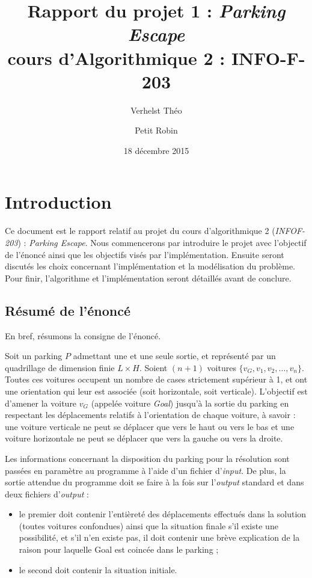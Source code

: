 \documentclass{article}
\title{Rapport du projet 1 : \textit{Parking Escape}\\cours d'Algorithmique 2 : INFO-F-203}
\author{Verhelst Théo \and Petit Robin}
\date{18 décembre 2015}
\begin{document}
\maketitle
\tableofcontents
\newpage
{}

\section{Introduction}
	Ce document est le rapport relatif au projet du cours d'algorithmique 2 (\textit{INFOF-203}) : \textit{Parking Escape}. Nous commencerons par
	introduire le projet avec l'objectif de l'énoncé ainsi que les objectifs visés par l'implémentation. Ensuite seront discutés les choix concernant
	l'implémentation et la modélisation du problème. Pour finir, l'algorithme et l'implémentation seront détaillés avant de conclure.

	\subsection{Résumé de l'énoncé}
		En bref, résumons la consigne de l'énoncé.

		Soit un parking $P$ admettant une et une seule sortie, et représenté par un quadrillage de dimension finie $L\times H$. Soient $(n+1)$ voitures
		$\{v_G, v_1, v_2, \ldots, v_n\}$. Toutes ces voitures occupent un nombre de cases strictement supérieur à 1, et ont une
		orientation qui leur est associée (soit horizontale, soit verticale). L'objectif est d'amener la voiture $v_G$ (appelée voiture \textit{Goal})
		jusqu'à la sortie du parking en respectant les déplacements relatifs à l'orientation de chaque voiture, à savoir : une voiture verticale ne peut
		se déplacer que vers le haut ou vers le bas et une voiture horizontale ne peut se déplacer que vers la gauche ou vers la droite.

		Les informations concernant la disposition du parking pour la résolution sont passées en paramètre au programme à l'aide d'un fichier d'\textit{input}.
		De plus, la sortie attendue du programme doit se faire à la fois sur l'\textit{output} standard et dans deux fichiers d'\textit{output} :

		\begin{itemize}
			\item le premier doit contenir l'entièreté des déplacements effectués dans la solution (toutes voitures confondues)
			      ainsi que la situation finale s'il existe une possibilité, et s'il n'en existe pas, il doit contenir une brève
			      explication de la raison pour laquelle Goal est coincée dans le parking ;
			\item le second doit contenir la situation initiale.
		\end{itemize}
\end{document}
